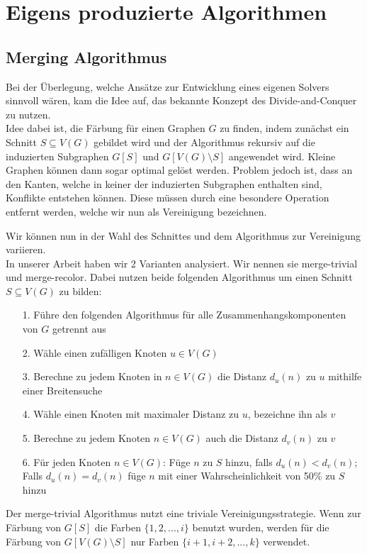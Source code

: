 \documentclass[11pt]{article}
\begin{document}
\section{Eigens produzierte Algorithmen} 

\subsection{Merging Algorithmus}
Bei der Überlegung, welche Ansätze zur Entwicklung eines eigenen Solvers sinnvoll wären,
kam die Idee auf, das bekannte Konzept des Divide-and-Conquer zu nutzen.\\
Idee dabei ist, die Färbung für einen Graphen $G$ zu finden, 
indem zunächst ein Schnitt $S\subseteq V(G)$ gebildet wird 
und der Algorithmus rekursiv auf die induzierten Subgraphen 
$G[S]$ und $G[V(G)\setminus S]$ angewendet wird.
Kleine Graphen können dann sogar optimal gelöst werden. 
Problem jedoch ist, dass an den Kanten, 
welche in keiner der induzierten Subgraphen enthalten sind,
Konflikte entstehen können. Diese müssen durch eine besondere Operation entfernt werden, 
welche wir nun als Vereinigung bezeichnen.\par

Wir können nun in der Wahl des Schnittes und dem Algorithmus zur Vereinigung variieren.\\
In unserer Arbeit haben wir 2 Varianten analysiert. Wir nennen sie merge-trivial und merge-recolor.
Dabei nutzen beide folgenden Algorithmus um einen Schnitt $S\subseteq V(G)$ zu bilden:
\begin{itemize}
\item[1.] Führe den folgenden Algorithmus für alle Zusammenhangskomponenten von $G$ getrennt aus
\item[2.] Wähle einen zufälligen Knoten $u\in V(G)$
\item[3.] Berechne zu jedem Knoten in $n\in V(G)$ die Distanz $d_u(n)$ zu $u$ mithilfe einer Breitensuche
\item[4.] Wähle einen Knoten mit maximaler Distanz zu $u$, bezeichne ihn als $v$
\item[5.] Berechne zu jedem Knoten $n\in V(G)$ auch die Distanz $d_v(n)$ zu $v$
\item[6.] Für jeden Knoten $n\in V(G)$: Füge $n$ zu $S$ hinzu, falls $d_u(n)<d_v(n)$; Falls $d_u(n)=d_v(n)$ füge $n$ mit einer Wahrscheinlichkeit von 50\% zu $S$ hinzu
\end{itemize}

Der merge-trivial Algorithmus nutzt eine triviale Vereinigungsstrategie.
Wenn zur Färbung von $G[S]$ die Farben $\{1,2,...,i\}$ benutzt wurden, 
werden für die Färbung von $G[V(G)\setminus S]$ nur Farben $\{i+1,i+2,...,k\}$ verwendet.\\
\end{document}
